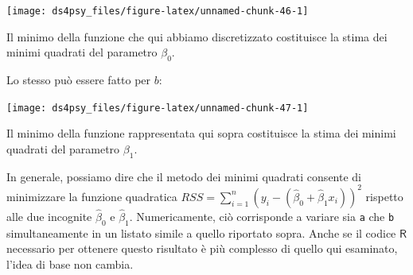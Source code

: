 \documentclass[
  11pt,
]{krantz}
\makeatletter
\newenvironment{Shaded}{\begin{snugshade}}{\end{snugshade}}
\newcommand{\AttributeTok}[1]{\textcolor[rgb]{0.61,0.61,0.61}{#1}}
\newcommand{\DecValTok}[1]{\textcolor[rgb]{0.06,0.06,0.06}{#1}}
\newcommand{\FloatTok}[1]{\textcolor[rgb]{0.06,0.06,0.06}{#1}}
\newcommand{\FunctionTok}[1]{\textcolor[rgb]{0,0,0}{#1}}
\newcommand{\NormalTok}[1]{#1}
\newcommand{\SpecialCharTok}[1]{\textcolor[rgb]{0,0,0}{#1}}
\newcommand{\StringTok}[1]{\textcolor[rgb]{0.5,0.5,0.5}{#1}}
\newenvironment{kframe}{%
\medskip{}
\setlength{\fboxsep}{.8em}
 \def\at@end@of@kframe{}%
 \ifinner\ifhmode%
  \def\at@end@of@kframe{\end{minipage}}%
  \begin{minipage}{\columnwidth}%
 \fi\fi%
 \def\FrameCommand##1{\hskip\@totalleftmargin \hskip-\fboxsep
 \colorbox{shadecolor}{##1}\hskip-\fboxsep
     \hskip-\linewidth \hskip-\@totalleftmargin \hskip\columnwidth}%
 \MakeFramed {\advance\hsize-\width
   \@totalleftmargin\z@ \linewidth\hsize
   \@setminipage}}%
 {\par\unskip\endMakeFramed%
 \at@end@of@kframe}
\renewenvironment{Shaded}{\begin{kframe}}{\end{kframe}}
\newcommand{\R}{\textsf{R}} %
\theoremstyle{definition}
\theoremstyle{definition}
\theoremstyle{definition}
\theoremstyle{definition}
\theoremstyle{remark}
\makeatother
\begin{document}
\begin{center}\texttt{[image: ds4psy\_files/figure-latex/unnamed-chunk-46-1]} \end{center}

Il minimo della funzione che qui abbiamo discretizzato costituisce la stima dei minimi quadrati del parametro \(\beta_0\).

Lo stesso può essere fatto per \(b\):

\begin{Shaded}
\end{Shaded}

\begin{center}\texttt{[image: ds4psy\_files/figure-latex/unnamed-chunk-47-1]} \end{center}

Il minimo della funzione rappresentata qui sopra costituisce la stima dei minimi quadrati del parametro \(\beta_1\).

In generale, possiamo dire che il metodo dei minimi quadrati consente di minimizzare la funzione quadratica \(RSS = \sum_{i=1}^n \left(y_i - (\hat{\beta}_0 + \hat{\beta}_1 x_i)\right)^2\) rispetto alle due incognite \(\hat{\beta}_0\) e \(\hat{\beta}_1\). Numericamente, ciò corrisponde a variare sia \texttt{a} che \texttt{b} simultaneamente in un listato simile a quello riportato sopra. Anche se il codice \(\R\) necessario per ottenere questo risultato è più complesso di quello qui esaminato, l'idea di base non cambia.
\end{document}
